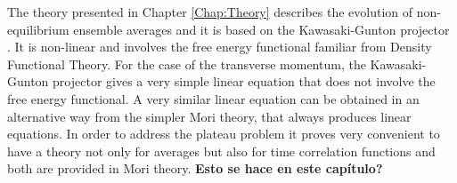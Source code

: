 \documentclass[a4paper,openright,12pt]{book}
\newcommand{\Note}[1]{{\bf \color{red}#1}}    %
\begin{document}
The  theory presented  in Chapter \ref{Chap:Theory} describes  the
evolution of non-equilibrium ensemble averages  and it is based on the
Kawasaki-Gunton  projector \cite{Grabert1982}.   It is  non-linear and
involves the  free energy functional familiar  from Density Functional
Theory.  For the case of  the transverse momentum, the Kawasaki-Gunton
projector gives  a very simple  linear equation that does  not involve
the free  energy functional.   A very similar  linear equation  can be
obtained  in an  alternative way  from the  simpler Mori  theory, that
always produces  linear equations.   In order  to address  the plateau
problem  it proves  very  convenient to  have a  theory  not only  for
averages but also for time correlation functions and both are provided
in Mori theory.  \Note{Esto se hace en este capítulo?}
\end{document}
